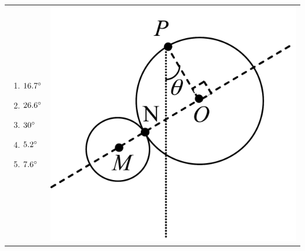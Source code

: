 \documentclass[12pt,letterpaper]{article}
\begin{document}
\begin{enumerate}[resume]
\begin{tabular}{l r}
\begin{minipage}{0.6\textwidth}
\begin{enumerate}
\item $16.7\degree$
\item $26.6\degree$
\item $30\degree$
\item $5.2\degree$
\item $7.6\degree$
\end{enumerate}
\end{minipage} &
\begin{minipage}{0.3\textwidth}
\includegraphics[width=\textwidth,left]{disks.png}
\end{minipage}
\end{tabular}



\end{enumerate}
\end{document}
